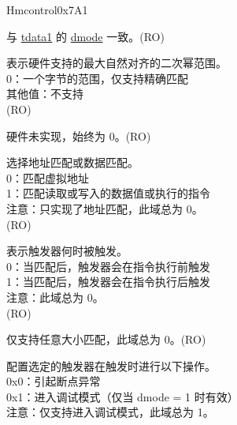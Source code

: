 \begin{register}{H}{mcontrol}{0x7A1}\label{regdesc:LPMCONTROL}
%
%
%
%
%
%
%
%
%
%
%
%
%
%
%
%
%
\regnewline%
\begin{regdesc}\begin{reglist}
\label{fielddesc:LPMCONTROLDMODE}\item [dmode] 与 \hyperref[regdesc:LPTDATA1]{tdata1} 的 \hyperref[fielddesc:LPTDATA1DMODE]{dmode} 一致。(RO)
\label{fielddesc:LPMCONTROLMASKMAX}\item [maskmax] 表示硬件支持的最大自然对齐的二次幂范围。\\
0：一个字节的范围，仅支持精确匹配\\
其他值：不支持\\
(RO)
\label{fielddesc:LPMCONTROLHIT}\item [hit] 硬件未实现，始终为 0。(RO)
\label{fielddesc:LPMCONTROLSELECT}\item [select] 选择地址匹配或数据匹配。\\
0：匹配虚拟地址\\
1：匹配读取或写入的数据值或执行的指令\\
注意：只实现了地址匹配，此域总为 0。\\
(RO)
\label{fielddesc:LPMCONTROLTIMING}\item [timing] 表示触发器何时被触发。\\
0：当匹配后，触发器会在指令执行前触发\\
1：当匹配后，触发器会在指令执行后触发\\
注意：此域总为 0。 \\
(RO)
\label{fielddesc:LPMCONTROLSIZELO}\item [sizelo] 仅支持任意大小匹配，此域总为 0。(RO)
\label{fielddesc:LPMCONTROLACTION}\item [action] 配置选定的触发器在触发时进行以下操作。\\
0x0：引起断点异常\\
0x1：进入调试模式（仅当 dmode = 1 时有效）\\
注意：仅支持进入调试模式，此域总为 1。\\

\end{reglist}
\end{regdesc}
\end{register}
